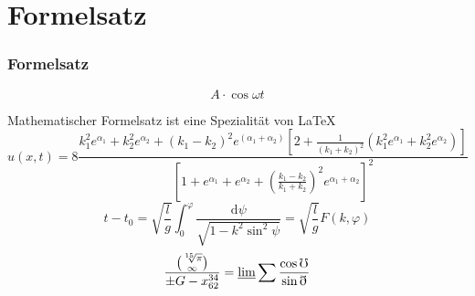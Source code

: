 \documentclass[9pt]{beamer}
\begin{document}
\section{Formelsatz}
\begin{frame}
	\frametitle{Formelsatz}
    \begin{equation*}
        A \cdot \cos{\omega t}
    \end{equation*}
	\begin{block}{Mathematischer Formelsatz ist eine Spezialität von \LaTeX}
		\begin{equation*}
		u(x,t)= 8 \frac{k_{1}^{2}e^{\alpha_{1}} + k_{2}^{2}e^{\alpha_{2}} + (k_{1}-k_{2})^{2}e^{(\alpha_{1}+ \alpha_{2})} \left[2 + \frac{1}{(k_{1} + k_{2})^{2}} ( k_{1}^{2}e^{\alpha_{1}} + k_{2}^{2}e^{\alpha_{2}}) \right]}{\left[1+e^{\alpha_{1}} + e^{\alpha_{2}} + \left(\frac{k_{1} - k_{2}}{k_{1}+k_{2}} \right)^{2} e^{\alpha_{1}+ \alpha_{2}} \right]^{2}}
		\end{equation*}
		\begin{equation*}
			t-t_{0}=\sqrt{\frac{l}{g}}\int_{0}^{\varphi}{\frac{\mathrm{d}\psi}{\sqrt{1-k^{2}\sin^{2} {\psi}}}} = \sqrt{\frac{l}{g}} F(k,\varphi)
		\end{equation*}
		\begin{equation*}
			\frac{\binom{\sqrt[15]{\pi}}{\infty}}{\pm G - x_{62}^{34}} = \varliminf \sum \frac{\cos \mho}{\sin \eth}
		\end{equation*}
	\end{block}
\end{frame}
\end{document}
